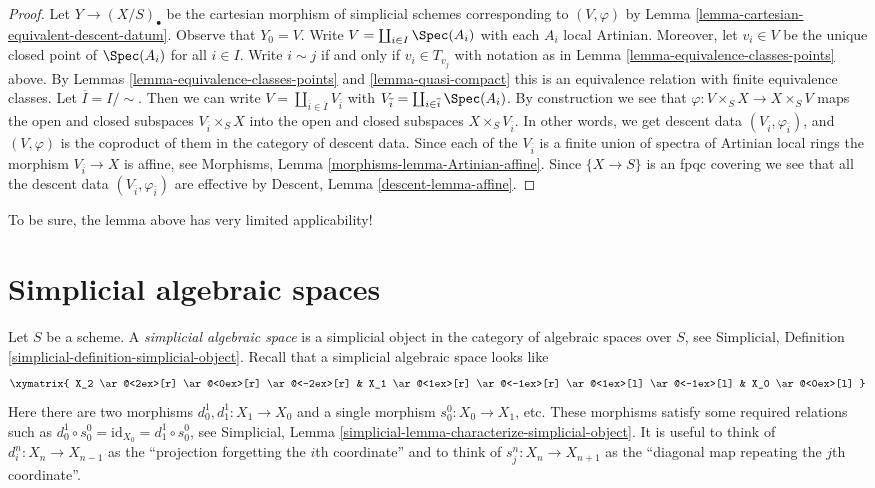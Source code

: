 \begin{proof}
Let $Y \to (X/S)_\bullet$ be the cartesian morphism of simplicial
schemes corresponding to $(V, \varphi)$ by
Lemma \ref{lemma-cartesian-equivalent-descent-datum}.
Observe that $Y_0 = V$.
Write $V = \coprod_{i \in I} \Spec(A_i)$ with each $A_i$ local
Artinian. Moreover, let $v_i \in V$ be the unique closed point of
$\Spec(A_i)$ for all $i \in I$. Write $i \sim j$ if and only if
$v_i \in T_{v_j}$ with notation as in
Lemma \ref{lemma-equivalence-classes-points} above.
By Lemmas \ref{lemma-equivalence-classes-points} and \ref{lemma-quasi-compact}
this is an equivalence relation with finite equivalence
classes. Let $\overline{I} = I/\sim$. Then we can write
$V = \coprod_{\overline{i} \in \overline{I}} V_{\overline{i}}$
with
$V_{\overline{i}} = \coprod_{i \in \overline{i}} \Spec(A_i)$.
By construction we see that
$\varphi : V \times_S X \to X \times_S V$ maps
the open and closed subspaces $V_{\overline{i}} \times_S X$
into the open and closed subspaces $X \times_S V_{\overline{i}}$.
In other words, we get descent data
$(V_{\overline{i}}, \varphi_{\overline{i}})$, and
$(V, \varphi)$ is the coproduct of them in the category of
descent data.
Since each of the $V_{\overline{i}}$ is a finite union of
spectra of Artinian local rings the morphism $V_{\overline{i}} \to X$
is affine, see Morphisms, Lemma \ref{morphisms-lemma-Artinian-affine}.
Since $\{X \to S\}$ is an fpqc covering we see that all
the descent data $(V_{\overline{i}}, \varphi_{\overline{i}})$ are effective
by Descent, Lemma \ref{descent-lemma-affine}.
\end{proof}

\noindent
To be sure, the lemma above has very limited applicability!









\section{Simplicial algebraic spaces}
\label{section-simplicial-algebraic-spaces}

\noindent
Let $S$ be a scheme. A {\it simplicial algebraic space}
is a simplicial object in the category of algebraic spaces over $S$,
see Simplicial, Definition \ref{simplicial-definition-simplicial-object}.
Recall that a simplicial algebraic space looks like
$$
\xymatrix{
X_2
\ar@<2ex>[r]
\ar@<0ex>[r]
\ar@<-2ex>[r]
&
X_1
\ar@<1ex>[r]
\ar@<-1ex>[r]
\ar@<1ex>[l]
\ar@<-1ex>[l]
&
X_0
\ar@<0ex>[l]
}
$$
Here there are two morphisms $d^1_0, d^1_1 : X_1 \to X_0$
and a single morphism $s^0_0 : X_0 \to X_1$, etc.
These morphisms satisfy some required relations such as
$d^1_0 \circ s^0_0 = \text{id}_{X_0} = d^1_1 \circ s^0_0$, see
Simplicial, Lemma \ref{simplicial-lemma-characterize-simplicial-object}.
It is useful to think of $d^n_i : X_n \to X_{n - 1}$
as the ``projection forgetting the $i$th coordinate'' and
to think of $s^n_j : X_n \to X_{n + 1}$ as the ``diagonal map repeating
the $j$th coordinate''.

